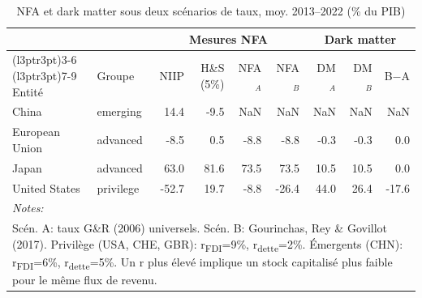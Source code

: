 \documentclass[11pt]{article}
\begin{document}
\small\setcounter{table}{6}
\begin{table}[!h]
\centering
\caption{\label{tab:tab:summ_scen}NFA et dark matter sous deux scénarios de taux, moy. 2013--2022 (\% du PIB)}
\centering
\fontsize{10}{12}\selectfont
\begin{tabular}[t]{llrrrrrrr}
\toprule
\multicolumn{2}{c}{\textbf{ }} & \multicolumn{4}{c}{\textbf{Mesures NFA}} & \multicolumn{3}{c}{\textbf{Dark matter}} \\
\cmidrule(l{3pt}r{3pt}){3-6} \cmidrule(l{3pt}r{3pt}){7-9}
Entité & Groupe & NIIP & H\&S (5\%) & NFA$_A$ & NFA$_B$ & DM$_A$ & DM$_B$ & B$-$A\\
\midrule
China & emerging & 14.4 & -9.5 & NaN & NaN & NaN & NaN & NaN\\
European Union & advanced & -8.5 & 0.5 & -8.8 & -8.8 & -0.3 & -0.3 & 0.0\\
Japan & advanced & 63.0 & 81.6 & 73.5 & 73.5 & 10.5 & 10.5 & 0.0\\
United States & privilege & -52.7 & 19.7 & -8.8 & -26.4 & 44.0 & 26.4 & -17.6\\
\bottomrule
\multicolumn{9}{l}{\rule{0pt}{1em}\textit{\textit{Notes:} }}\\
\multicolumn{9}{l}{\rule{0pt}{1em}Scén. A: taux G\&R (2006) universels. Scén. B: Gourinchas, Rey \& Govillot (2017). Privilège (USA, CHE, GBR): r\textsubscript{FDI}=9\%, r\textsubscript{dette}=2\%. Émergents (CHN): r\textsubscript{FDI}=6\%, r\textsubscript{dette}=5\%. Un r plus \'{e}lev\'{e} implique un stock capitalis\'{e} plus faible pour le m\^{e}me flux de revenu.}\\
\end{tabular}
\end{table}
\end{document}
